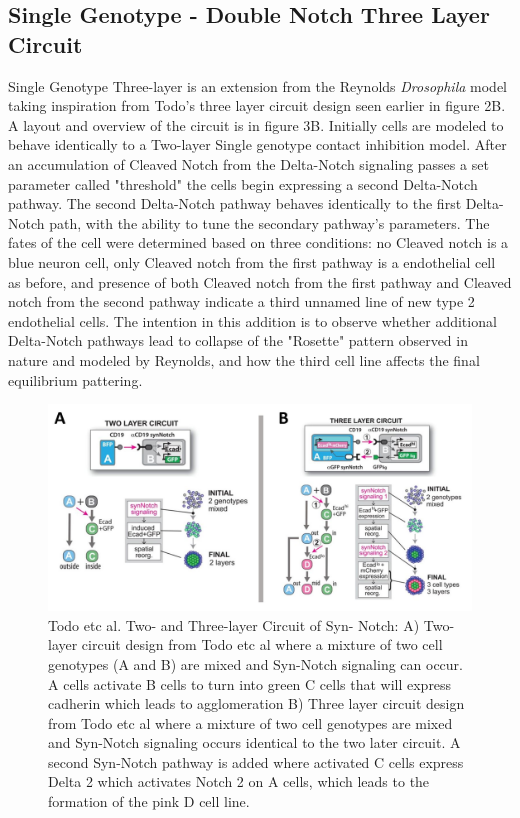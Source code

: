 \documentclass[12pt]{ifacconf}
\begin{document}
\subsection{Single Genotype - Double Notch Three Layer Circuit}

Single Genotype Three-layer is an extension from the Reynolds \emph{Drosophila} model taking inspiration from Todo's three layer circuit design seen earlier in figure 2B. A layout and overview of the circuit is in figure 3B. Initially cells are modeled to behave identically to a Two-layer Single genotype contact inhibition model. After an accumulation of Cleaved Notch from the Delta-Notch signaling passes a set parameter called "threshold" the cells begin expressing a second Delta-Notch pathway. The second Delta-Notch pathway behaves identically to the first Delta-Notch path, with the ability to tune the secondary pathway’s parameters. The fates of the cell were determined based on three conditions: no Cleaved notch is a blue neuron cell, only Cleaved notch from the first pathway is a endothelial cell as before, and presence of both Cleaved notch from the first pathway and Cleaved notch from the second pathway indicate a third unnamed line of new type 2 endothelial cells. The intention in this addition is to observe whether additional Delta-Notch pathways lead to collapse of the "Rosette" pattern observed in nature and modeled by Reynolds, and how the third cell line affects the final equilibrium pattering.



\begin{figure}
\begin{center}
\includegraphics[width=\textwidth]{Todo_etc_al_layer_circuit_design} %
\caption{Todo etc al. Two- and Three-layer Circuit of Syn- Notch: A) Two-layer circuit design from Todo etc al where a mixture of two cell genotypes (A and B) are mixed and Syn-Notch signaling can occur. A cells activate B cells to turn into green C cells that will express cadherin which leads to agglomeration B) Three layer circuit design from Todo etc al where a mixture of two cell genotypes are mixed and Syn-Notch signaling occurs identical to the two later circuit. A second Syn-Notch pathway is added where activated C cells express Delta 2 which activates Notch 2 on A cells, which leads to the formation of the pink D cell line. } 
\label{fig:bifurcation}
\end{center}
\end{figure}
\end{document}

